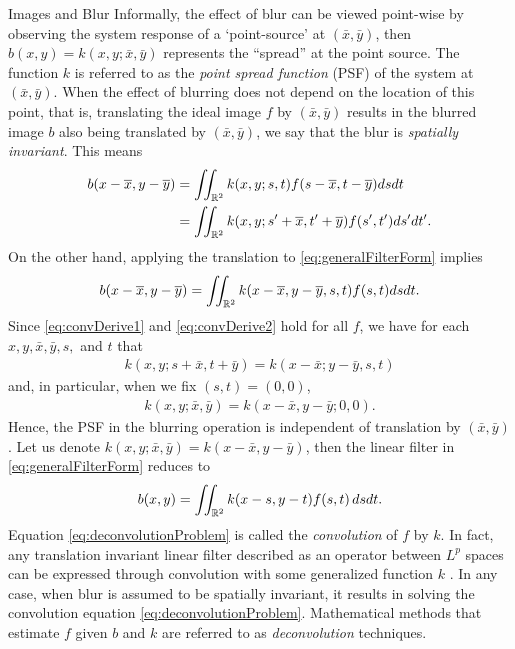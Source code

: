 \begin{chapter}{Images and Blur}
  Informally, the effect of blur can be viewed point-wise by observing the system response of a `point-source' at $(\bar x,\bar y)$, %
  then $b(x,y) = k(x,y;\bar x,\bar y)$ represents the ``spread'' at the point source.
  The function $k$ is referred to as the \emph{point spread function} (PSF) of the system at $(\bar x,\bar y)$.
  When the effect of blurring does not depend on the location of this point, that is, translating the ideal image $f$ by $(\bar x, \bar y)$ results in the blurred image $b$ also being translated by $(\bar x,\bar y)$, we say that the blur is \emph{spatially invariant}. 
  This means
\begin{align} 
  b(x-\overline x,y-\overline y) 
  &= \iint_{\mathbb R^2} k(x,y;s,t) f(s-\overline x,t - \overline y)dsdt \nonumber\\
  &= \iint_{\mathbb R^2} k(x,y;s'+\overline x,t'+\overline y) f(s',t')ds'dt'.\label{eq:convDerive1}
\end{align}
  On the other hand, applying the translation to \eqref{eq:generalFilterForm} implies
\begin{equation} \label{eq:convDerive2}
  b(x-\overline x,y-\overline y) = \iint_{\mathbb R^2} k(x-\overline x,y-\overline y,s,t) f(s,t)dsdt. 
\end{equation}
  Since \eqref{eq:convDerive1} and \eqref{eq:convDerive2} hold for all $f$, we have for each $x,y,\bar x, \bar y,s,$ and $t$ that
\begin{align} 
 k(x,y;s+\bar x,t+\bar y) = k(x-\bar x;y-\bar y,s,t) 
\end{align}
  and, in particular, when we fix $(s,t) = (0,0)$,
\begin{align} 
 k(x,y;\bar x,\bar y) = k(x-\bar x,y-\bar y;0,0).
\end{align}
Hence, the PSF in the blurring operation is independent of translation by $(\bar x,\bar y)$.
  Let us denote $k(x,y;\bar x,\bar y) = k(x-\bar x,y-\bar y)$, then the linear filter in \eqref{eq:generalFilterForm} reduces to   
\begin{equation}\label{eq:deconvolutionProblem}
  b(x,y) = \iint_{\mathbb R^2} k(x-s,y-t) f(s,t)\,dsdt.
\end{equation}
  Equation \eqref{eq:deconvolutionProblem} is called the \emph{convolution} of $f$ by $k$.
  In fact, any translation invariant linear filter described as an operator between $L^p$ spaces can be expressed through convolution with some generalized function $k$ \citep{grafakos2014}.
  In any case, when blur is assumed to be spatially invariant, it results in solving the convolution equation \eqref{eq:deconvolutionProblem}.
  Mathematical methods that estimate $f$ given $b$ and $k$ are referred to as \emph{deconvolution} techniques.


\end{chapter}
